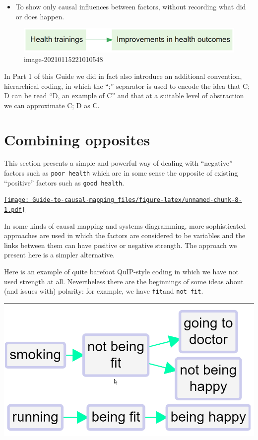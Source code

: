 \documentclass[
]{book}
\providecommand{\tightlist}{%
  \setlength{\itemsep}{0pt}\setlength{\parskip}{0pt}}
\begin{document}
\begin{itemize}
\tightlist
\item
  To show only causal influences between factors, without recording what did or does happen.
\end{itemize}

\begin{figure}
\centering
\includegraphics{_assets/image-20210115221010548.png}
\caption{image-20210115221010548}
\end{figure}

In Part 1 of this Guide we did in fact also introduce an additional convention, hierarchical coding, in which the ``;'' separator is used to encode the idea that C; D can be read ``D, an example of C'' and that at a suitable level of abstraction we can approximate C; D as C.

\hypertarget{combining-opposites}{%
\section{Combining opposites}\label{combining-opposites}}

This section presents a simple and powerful way of dealing with ``negative'' factors such as \texttt{poor\ health} which are in some sense the opposite of existing ``positive'' factors such as \texttt{good\ health}.

\href{https://player.vimeo.com/video/636997200}{\texttt{[image: Guide-to-causal-mapping\_files/figure-latex/unnamed-chunk-8-1.pdf]}}

In some kinds of causal mapping and systems diagramming, more sophisticated approaches are used in which the factors are considered to be variables and the links between them can have positive or negative strength. The approach we present here is a simpler alternative.

Here is an example of quite barefoot QuIP-style coding in which we have not used strength at all. Nevertheless there are the beginnings of some ideas about (and issues with) polarity: for example, we have \texttt{fit}and \texttt{not\ fit}.

\includegraphics[width=6.77083in,height=\textheight]{_assets/121006.png}
\end{document}
